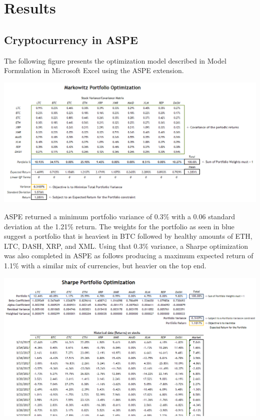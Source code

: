 \documentclass[11pt]{article} %
\begin{document}
\section{Results}

\subsection{Cryptocurrency in ASPE}

The following figure presents the optimization model described in Model Formulation in Microsoft Excel using the ASPE extension.

\includegraphics[width=\textwidth]{aspe1}

ASPE returned a minimum portfolio variance of 0.3\% with a 0.06 standard deviation at the 1.21\% return.  The weights for the portfolio as seen in blue suggest a portfolio that is heaviest in BTC followed by healthy amounts of ETH, LTC, DASH, XRP, and XML.  Using that 0.3\% variance, a Sharpe optimization was also completed in ASPE as follows producing a maximum expected return of 1.1\% with a similar mix of currencies, but heavier on the top end.

\includegraphics[width=\textwidth]{aspe3}
\end{document}

